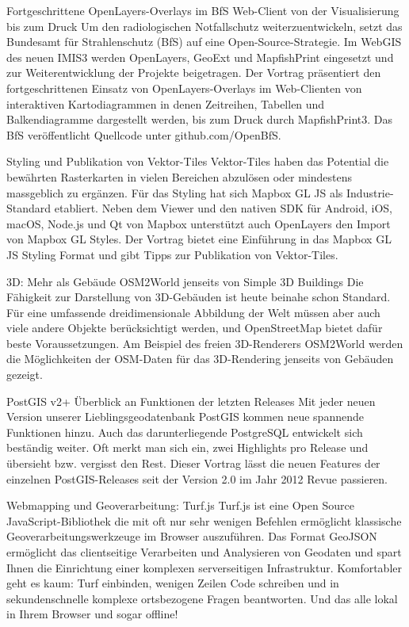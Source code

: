%
{Fortgeschrittene OpenLayers-Overlays im BfS Web-Client}%
{von der Visualisierung bis zum Druck}%
{%
Um den radiologischen Notfallschutz weiterzuentwickeln, setzt das Bundesamt für Strahlenschutz (BfS) auf eine Open-Source-Strategie. Im WebGIS des neuen IMIS3 werden OpenLayers, GeoExt und MapfishPrint eingesetzt und zur Weiterentwicklung der Projekte beigetragen. Der Vortrag präsentiert den fortgeschrittenen Einsatz von OpenLayers-Overlays im Web-Clienten von interaktiven Kartodiagrammen in denen Zeitreihen, Tabellen und Balkendiagramme dargestellt werden, bis zum Druck durch MapfishPrint3. Das BfS veröffentlicht Quellcode unter github.com/OpenBfS.%
}

%
{Styling und Publikation von Vektor-Tiles}%
{}%
{%
Vektor-Tiles haben das Potential die bewährten Rasterkarten in vielen Bereichen abzulösen oder mindestens massgeblich zu ergänzen. Für das Styling hat sich Mapbox GL JS als Industrie-Standard etabliert. Neben dem Viewer und den nativen SDK für Android, iOS, macOS, Node.js und Qt von Mapbox unterstützt auch OpenLayers den Import von Mapbox GL Styles.
Der Vortrag bietet eine Einführung in das Mapbox GL JS Styling Format und gibt Tipps zur Publikation von Vektor-Tiles.%
}

%
{3D: Mehr als Gebäude}%
{OSM2World jenseits von Simple 3D Buildings}%
{%
Die Fähigkeit zur Darstellung von 3D-Gebäuden ist heute beinahe schon Standard. Für eine umfassende dreidimensionale Abbildung der Welt müssen aber auch viele andere Objekte berücksichtigt werden, und OpenStreetMap bietet dafür beste Voraussetzungen. Am Beispiel des freien 3D-Renderers OSM2World werden die Möglichkeiten der OSM-Daten für das 3D-Rendering jenseits von Gebäuden gezeigt.%
}


%
{PostGIS v2+}%
{Überblick an Funktionen der letzten Releases}%
{%
Mit jeder neuen Version unserer Lieblingsgeodatenbank PostGIS kommen neue spannende Funktionen hinzu. Auch das darunterliegende PostgreSQL entwickelt sich beständig weiter. Oft merkt man sich ein, zwei Highlights pro Release und übersieht bzw. vergisst den Rest. Dieser Vortrag lässt die neuen Features der einzelnen PostGIS-Releases seit der Version 2.0 im Jahr 2012 Revue passieren.%
}

%
{Webmapping und Geoverarbeitung: Turf.js}%
{}%
{%
Turf.js ist eine Open Source JavaScript-Bibliothek die mit oft nur sehr wenigen Befehlen ermöglicht klassische Geoverarbeitungswerkzeuge im Browser auszuführen. Das Format GeoJSON ermöglicht das clientseitige Verarbeiten und Analysieren von Geodaten und spart Ihnen die Einrichtung einer komplexen serverseitigen Infrastruktur. Komfortabler geht es kaum: Turf einbinden, wenigen Zeilen Code schreiben und in sekundenschnelle komplexe ortsbezogene Fragen beantworten. Und das alle lokal in Ihrem Browser und sogar offline!%
}


